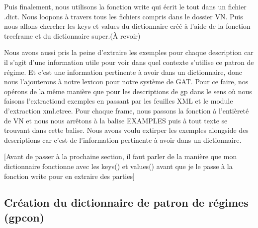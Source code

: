\documentclass[12pt,maitrise,frenchb,natbib,twoside,initial]{dms}
\numberwithin{equation}{section}
\numberwithin{table}{chapter}
\numberwithin{figure}{chapter}
\begin{document}
Puis finalement, nous  utilisons la fonction write qui écrit le tout dans un fichier .dict. Nous loopons à travers tous les fichiers compris dans le dossier VN. Puis nous allons chercher les keys et values du dictionnaire créé à l'aide de la fonction treeframe et du dictionnaire super.(À revoir)

Nous avons aussi pris la peine d'extraire les exemples pour chaque description car il s'agit d'une information utile pour voir dans quel contexte s'utilise ce patron de régime. Et c'est une information pertinente à avoir dans un dictionnaire, donc nous l'ajouterons à notre lexicon pour notre système de GAT. Pour ce faire, nos opérons de la même manière que pour les descriptions de gp dans le sens où nous faisons l'extractiond exemples en passant par les feuilles XML et le module d'extraction xml.etree. Pour chaque frame, nous passons la fonction à l'entièreté de VN et nous nous arrêtons à la balise EXAMPLES puis à tout texte se trouvant dans cette balise. Nous avons voulu extirper les exemples alongside des descriptions car c'est de l'information pertinente à avoir dans un dictionnaire.

[Avant de passer à la prochaine section, il faut parler de la manière que mon dictionnaire fonctionne avec les keys() et values() avant que je le passe à la fonction write pour en extraire des parties]

\subsection{Création du dictionnaire de patron de régimes (gpcon)}
\end{document}
